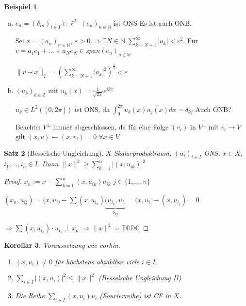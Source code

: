 \documentclass[ngerman]{report}
\theoremstyle{plain}%
\newtheorem{thm}{Satz}[chapter]
\newtheorem{cor}[thm]{Korollar}
\theoremstyle{definition}%
\newtheorem{bsp}[thm]{Beispiel}
\theoremstyle{myStyle}
\newcommand{\Z}{\mathbb{Z}}
\newcommand{\N}{\mathbb{N}}
\newcommand{\norm}[1]{\|#1\|}
\newcommand{\df}[1][]{%
	\overset{#1}{\Rightarrow}
}
\newcommand{\TODO}{\text{$\mathbb{TODO}$}}
\newcommand{\ff}[3]{(#1_#2)_{#2\in#3}}
\begin{document}
	\begin{bsp}
		\begin{enumerate}[a)]
			\item $e_n = (\delta_{in})_{i\in I} \in \ell^2$ $(e_n)_{n\in \N}$ ist ONS
			Es ist auch ONB.\par
			Sei $x = (a_n)_{n\in \N}$, $\varepsilon > 0. \df \exists N \in \N. \sum_{k=N+1}^\infty |a_k| < \varepsilon^2$.
			Für $v = a_1e_1 + \dots + a_Ne_N \in span(e_n)_{n\in\N}$ \par
			$\norm{v - x }_2 = (\sum_{k = N +1}^ \infty |a_k|^2)^{\frac{1}{2}} < \varepsilon$

			\item $\ff{u}{k}{\Z}$ mit $u_k(x) = \frac{1}{\sqrt{2\pi}} e^{ikx}$ \par
			$u_k \in L^2([0,2\pi])$ ist ONS, da $\int_0^{2\pi} u_k(x) \overline{u_j(x)} dx = \delta_{kj}$ Auch ONB? \par
			Beachte: $V^\perp$ immer abgeschlossen, da für eine Folge $(v_i)$ in $V^\perp$ mit $v_i \to V$ gilt $(x,v) \leftarrow (x,v_i) = 0 \; \forall x\in V$
		\end{enumerate}
	\end{bsp}

	\begin{thm}[Besselsche Ungleichung]
		$X$ Skalarproduktraum, $\ff{u}{i}{I}$ ONS, $x\in X$, $i_1,\dots,i_n \in I$. Dann $\norm{x}^2 \geq \sum_{k=1}^n |(x,u_{ik})|^2$
	\end{thm}

	\begin{proof}
		$x_n := x - \sum_{k=1}^n (x,u_{ik}) u_{ik}$ $j\in \{1,\dots,n\}$\par
		$(x_n, u_{ij}) = (x,u_{ij} - \sum (x,u_{i_k}) \underbrace{(u_{i_k},u_{i_j}}_{\delta_{kj}}
		= (x, u_{i_j} - (x, u_{i_j}) = 0$\par
		$\df \sum (x, u_{i_k}) \cdot u_{i_k} \perp x_n$
	$\df \norm{x}^2 = \TODO$
	\end{proof}

	\begin{cor}
		Voraussetzung wie vorhin.\par
		\begin{enumerate}
			\item $(x, u_i) \neq 0$ für höchstens abzählbar viele $i\in I$.
			\item $\sum_{i\in I} |(x, u_i)|^2 \leq \norm{x}^2$ (Besselsche Ungleichung II)
			\item Die Reihe $\sum_{i\in I} (x,u_i)u_i$ (Fourierreihe) ist CF in $X$.
		\end{enumerate}
	\end{cor}
\end{document}
